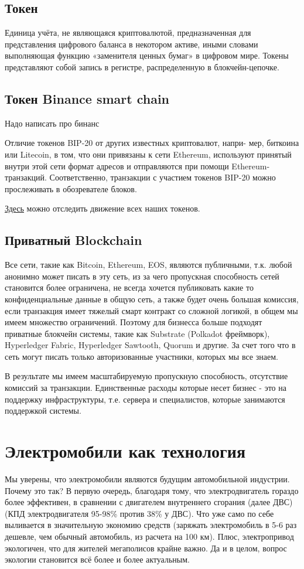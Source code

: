 \documentclass[a4paper,12pt]{report}
\newcommand{\contractAddress}{0x8eA9a18A98E5cDbE93cacEa82Ea3e9c2CB8Dc520}
\begin{document}
\section{Токен}
Единица учёта, не являющаяся криптовалютой, предназначенная для представления цифрового баланса в некотором активе, иными словами выполняющая функцию «заменителя ценных бумаг» в цифровом мире. Токены представляют собой запись в регистре, распределенную в блокчейн-цепочке.

\section{Токен Binance smart chain}
Надо написать про бинанс

Отличие токенов BIP-20 от других известных криптовалют, напри-
мер, биткоина или Litecoin, в том, что они привязаны к сети Ethereum, используют принятый внутри этой сети формат адресов и отправляются при помощи Ethereum-транзакций. Соответственно, транзакции с участием токенов BIP-20 можно прослеживать в обозревателе блоков.


\href{https://etherscan.io/address/\contractAddress}{Здесь} можно отследить движение всех наших токенов.

\section{Приватный Blockchain}
Все сети, такие как Bitcoin, Ethereum, EOS, являются публичными, т.к. любой анонимно может писать в эту сеть, из за чего пропускная способность сетей становится более ограничена, не всегда хочется публиковать какие то конфиденциальные данные в общую сеть, а также будет очень большая комиссия, если транзакция имеет тяжелый смарт контракт со сложной логикой, в общем мы имеем множество ограничений. Поэтому для бизнесса больше подходят приватные блокчейн системы, такие как Substrate (Polkadot фреймворк), Hyperledger Fabric, Hyperledger Sawtooth, Quorum и другие. За счет того что в сеть могут писать только авторизованные участники, которых мы все знаем. 

В результате мы имеем масштабируемую пропускную способность, отсутствие комиссий за транзакции. Единственные расходы которые несет бизнес - это на поддержку инфраструктуры, т.е. сервера и специалистов, которые занимаются поддержкой системы.



\chapter{Электромобили как технология}
\label{chapter3}
Мы уверены, что электромобили являются будущим автомобильной индустрии. Почему это так? 
В первую очередь, благодаря тому, что электродвигатель гораздо более эффективен, в сравнении с двигателем внутреннего сгорания (далее ДВС) (КПД электродвигателя 95-98\% против 38\% у ДВС). Что уже само по себе выливается в значительную экономию средств (заряжать электромобиль в 5-6 раз дешевле, чем обычный автомобиль, из расчета на 100 км). Плюс, электропривод экологичен, что для жителей мегаполисов крайне важно. Да и в целом, вопрос экологии становится всё более и более актуальным. 
\end{document}
